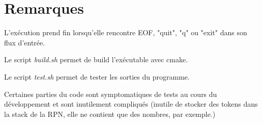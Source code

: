 \documentclass[]{article}
\begin{document}
\section{Remarques}
L'exécution prend fin lorsqu'elle rencontre EOF, "quit", "q" ou "exit" dans son flux d'entrée.

Le script \textit{build.sh} permet de build l'exécutable avec cmake.

Le script \textit{test.sh} permet de tester les sorties du programme. 

Certaines parties du code sont symptomatiques de tests au cours du développement et sont inutilement compliqués (inutile de stocker des tokens dans la stack de la RPN, elle ne contient que des nombres, par exemple.)
\end{document}
